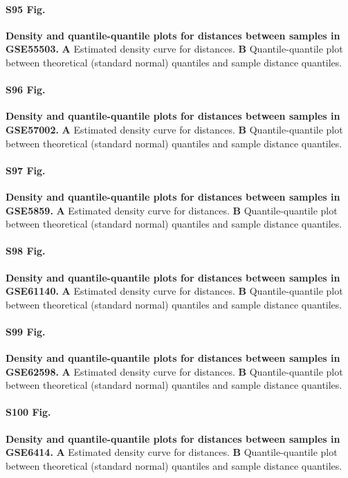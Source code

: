 \documentclass[10pt,letterpaper]{article}
\begin{document}
\paragraph*{S95 Fig.}
\hypertarget{S95_Fig}{
{\bf Density and quantile-quantile plots for distances between samples in GSE55503.} \textbf{A} Estimated density curve for distances. \textbf{B} Quantile-quantile plot between theoretical (standard normal) quantiles and sample distance quantiles.}

\paragraph*{S96 Fig.}
\hypertarget{S96_Fig}{
{\bf Density and quantile-quantile plots for distances between samples in GSE57002.} \textbf{A} Estimated density curve for distances. \textbf{B} Quantile-quantile plot between theoretical (standard normal) quantiles and sample distance quantiles.}

\paragraph*{S97 Fig.}
\hypertarget{S97_Fig}{
{\bf Density and quantile-quantile plots for distances between samples in GSE5859.} \textbf{A} Estimated density curve for distances. \textbf{B} Quantile-quantile plot between theoretical (standard normal) quantiles and sample distance quantiles.}

\paragraph*{S98 Fig.}
\hypertarget{S98_Fig}{
{\bf Density and quantile-quantile plots for distances between samples in GSE61140.} \textbf{A} Estimated density curve for distances. \textbf{B} Quantile-quantile plot between theoretical (standard normal) quantiles and sample distance quantiles.}

\paragraph*{S99 Fig.}
\hypertarget{S99_Fig}{
{\bf Density and quantile-quantile plots for distances between samples in GSE62598.} \textbf{A} Estimated density curve for distances. \textbf{B} Quantile-quantile plot between theoretical (standard normal) quantiles and sample distance quantiles.}

\paragraph*{S100 Fig.}
\hypertarget{S100_Fig}{
{\bf Density and quantile-quantile plots for distances between samples in GSE6414.} \textbf{A} Estimated density curve for distances. \textbf{B} Quantile-quantile plot between theoretical (standard normal) quantiles and sample distance quantiles.}
\end{document}
